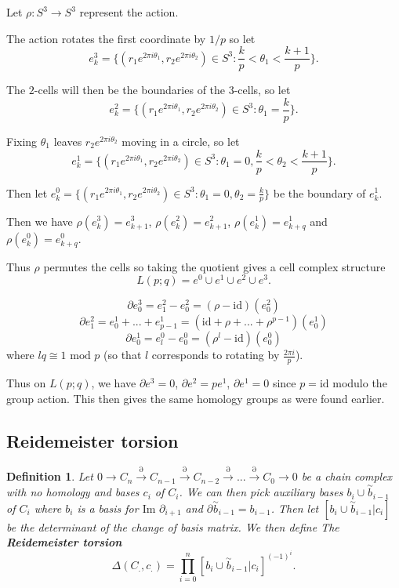 \documentclass{article}
\newtheorem{definition}[theorem]{Definition}
\begin{document}
\noindent Let $\rho\colon S^3\to S^3$ represent the action.

\noindent The action rotates the first coordinate by $1/p$ so let \[e_k^3=\{(r_1e^{2\pi i\theta_1},r_2e^{2\pi i\theta_2})\in S^3:\frac{k}{p}<\theta_1<\frac{k+1}{p}\}.\]

\noindent The $2$-cells will then be the boundaries of the $3$-cells, so let \[e_k^2=\{(r_1e^{2\pi i\theta_1},r_2e^{2\pi i\theta_2})\in S^3:\theta_1=\frac{k}{p}\}.\]

\noindent Fixing $\theta_1$ leaves $r_2e^{2\pi i\theta_2}$ moving in a circle, so let \[e_k^1=\{(r_1e^{2\pi i\theta_1},r_2e^{2\pi i\theta_2})\in S^3:\theta_1=0,\frac{k}{p}<\theta_2<\frac{k+1}{p}\}.\]

\noindent Then let $e_k^0=\{(r_1e^{2\pi i\theta_1},r_2e^{2\pi i\theta_2})\in S^3:\theta_1=0,\theta_2=\frac{k}{p}\}$ be the boundary of $e_k^1$.

\noindent Then we have $\rho(e_k^3)=e_{k+1}^3$, $\rho(e_k^2)=e_{k+1}^2$, $\rho(e_k^1)=e_{k+q}^1$ and $\rho(e_k^0)=e_{k+q}^0$.

\noindent Thus $\rho$ permutes the cells so taking the quotient gives a cell complex structure \[L(p;q)=e^0\cup e^1\cup e^2\cup e^3.\]

\[\partial e_0^3=e_1^2-e_0^2=(\rho-\text{id})(e_0^2)\]
\[\partial e_1^2=e_0^1+...+e_{p-1}^1=(\text{id}+\rho+...+\rho^{p-1})(e_0^1)\]
\[\partial e_0^1=e_l^0-e_0^0=(\rho^l-\text{id})(e_0^0)\] where $lq\cong1\text{ mod }p$ (so that $l$ corresponds to rotating by $\frac{2\pi i}{p}$).

\noindent Thus on $L(p;q)$, we have $\partial e^3=0$, $\partial e^2=pe^1$, $\partial e^1=0$ since $p=\text{id}$ modulo the group action. This then gives the same homology groups as were found earlier.

\subsection{Reidemeister torsion}
\begin{definition}
Let $0\to C_n\overset{\partial}{\to}C_{n-1}\overset{\partial}{\to}C_{n-2}\overset{\partial}{\to}...\overset{\partial}{\to}C_{0}\to 0$ be a chain complex with no homology and bases $c_i$ of $C_i$. We can then pick auxiliary bases $b_i\cup\overset{\sim}{b}_{i-1}$ of $C_i$ where $b_i$ is a basis for $\text{Im }\partial_{i+1}$ and $\partial\overset{\sim}{b}_{i-1}=b_{i-1}$. Then let $[b_i\cup\overset{\sim}{b}_{i-1}|c_i]$ be the determinant of the change of basis matrix. We then define The \textbf{Reidemeister torsion} \[\Delta(C_.,c_.)=\prod_{i=0}^n[b_i\cup\overset{\sim}{b}_{i-1}|c_i]^{(-1)^i}.\]
\end{definition}
\end{document}
